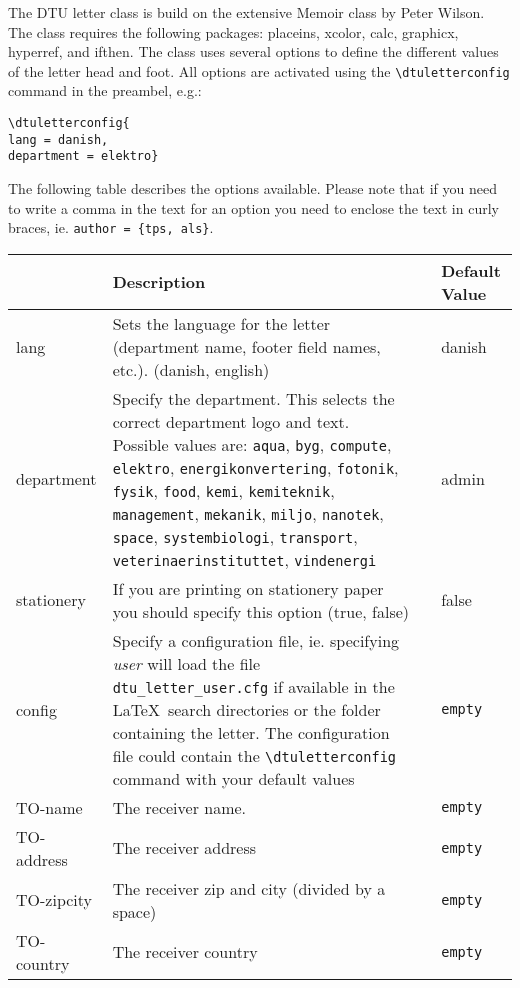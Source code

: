 \documentclass{dtuletter}
\newcommand{\optempty}{{\rmfamily\texttt{empty}}}
\begin{document}
The DTU letter class is build on the extensive Memoir class by Peter Wilson. The class requires the following packages: placeins, xcolor, calc, graphicx, hyperref, and ifthen. The class uses several options to define the different values of the letter head and foot. All options are activated using the \verb,\dtuletterconfig, command in the preambel, e.g.:

\begin{verbatim}
\dtuletterconfig{
lang = danish,
department = elektro} 
\end{verbatim}

The following table describes the options available. Please note that if you need to write a comma in the text for an option you need to enclose the text in curly braces, ie. \verb.author = {tps, als}..

\begin{longtable}{@{}>{\ttfamily}lp{75mm}>{\ttfamily}l>{}p{30mm}@{}}
\hline
{\normalfont Option} & Description & %
& {\normalfont Default Value}\\ \hline
lang 		& Sets the language for the letter (department name, footer field names, etc.). (danish, english) & & danish\\
department 	& Specify the department. This selects the correct department logo and text. Possible values are: \verb|aqua|, \verb|byg|, \verb|compute|, \verb|elektro|, \verb|energikonvertering|, \verb|fotonik|, \verb|fysik|, \verb|food|, \verb|kemi|, \verb|kemiteknik|, \verb|management|, \verb|mekanik|, \verb|miljo|, \verb|nanotek|, \verb|space|, \verb|systembiologi|, \verb|transport|, \verb|veterinaerinstituttet|, \verb|vindenergi| & & admin\\
stationery	& If you are printing on stationery paper you should specify this option (true, false) &  & false\\
config 		& Specify a configuration file, ie. specifying \emph{user} will load the file \verb,dtu_letter_user.cfg, if available in the \LaTeX\ search directories or the folder containing the letter. The configuration file could contain the \verb,\dtuletterconfig, command with your default values & & \optempty\\
TO-name 	& The receiver name. & & \optempty\\
TO-address	& The receiver address & & \optempty\\
TO-zipcity	& The receiver zip and city (divided by a space) & & \optempty\\
TO-country	& The receiver country & & \optempty\\

\end{longtable}
\end{document}
